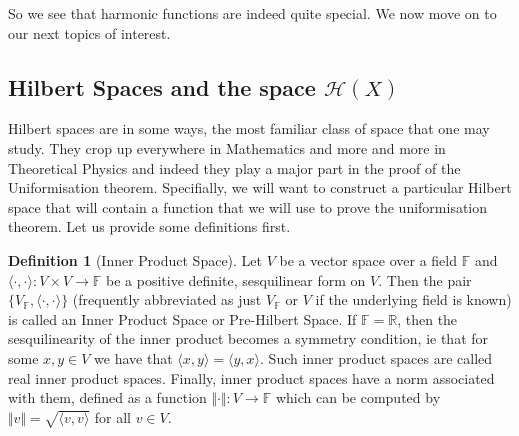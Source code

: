 \documentclass[11pt]{report}
\theoremstyle{definition}
\newtheorem{defn}[thm]{Definition}
\begin{document}
So we see that harmonic functions are indeed quite special. We now move on to our next topics of interest.

\subsection{Hilbert Spaces and the space $\mathcal{H}(X)$}

Hilbert spaces are in some ways, the most familiar class of space that one may study. They crop up everywhere in Mathematics and more and more in Theoretical Physics and indeed they play a major part in the proof of the Uniformisation theorem. Specifially, we will want to construct a particular Hilbert space that will contain a function that we will use to prove the uniformisation theorem. Let us provide some definitions first.

\begin{defn}[Inner Product Space]
  Let $V$ be a vector space over a field $\mathbb{F}$ and $\langle \cdot,\cdot \rangle \colon V \times V \rightarrow \mathbb{F}$ be a positive definite, sesquilinear form on $V$. Then the pair $\{V_{\mathbb{F}}, \langle \cdot,\cdot \rangle\}$ (frequently abbreviated as just $V_{\mathbb{F}}$ or $V$ if the underlying field is known) is called an Inner Product Space or Pre-Hilbert Space. If $\mathbb{F}=\mathbb{R}$, then the sesquilinearity of the inner product becomes a symmetry condition, ie that for some $x,y \in V$ we have that $\langle x, y \rangle = \langle y, x \rangle$. Such inner product spaces are called real inner product spaces.
  Finally, inner product spaces have a norm associated with them, defined as a function $\Vert \cdot\Vert  \colon V \rightarrow \mathbb{F}$ which can be computed by $\Vert v\Vert  = \sqrt{\langle v,v \rangle}$ for all $v \in V$. 
\end{defn}
\end{document}
